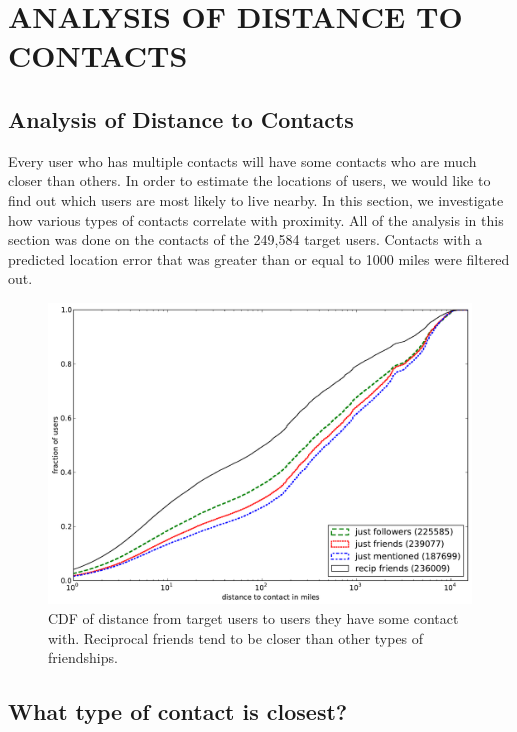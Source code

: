 \ifdefined\THESIS
    \chapter{\uppercase{Analysis of Distance to Contacts}}
\else
    \section{Analysis of Distance to Contacts}
    \label{sec:analysis}
\fi

Every user who has multiple contacts will have some contacts who are much
closer than others.
%
In order to estimate the locations of users, we would like
to find out which users are most likely to live nearby.
%
In this section, we investigate how various types of contacts correlate with
proximity.
%
All of the analysis in this section was done on the contacts of the 249,584
target users.
%
Contacts with a predicted location error that was greater than or equal to 1000
miles were filtered out.

\begin{figure}[tbh]
\centering
\includegraphics[width=\linewidth]{figures/edge_types_cuml.pdf}
\caption{
CDF of distance from target users to users they have some contact
with.
%
Reciprocal friends tend to be closer than other types of friendships.
}
\label{fig:EdgeTypesCuml}
\end{figure}

\section{What type of contact is closest?}
\label{sec:EdgeTypes}

